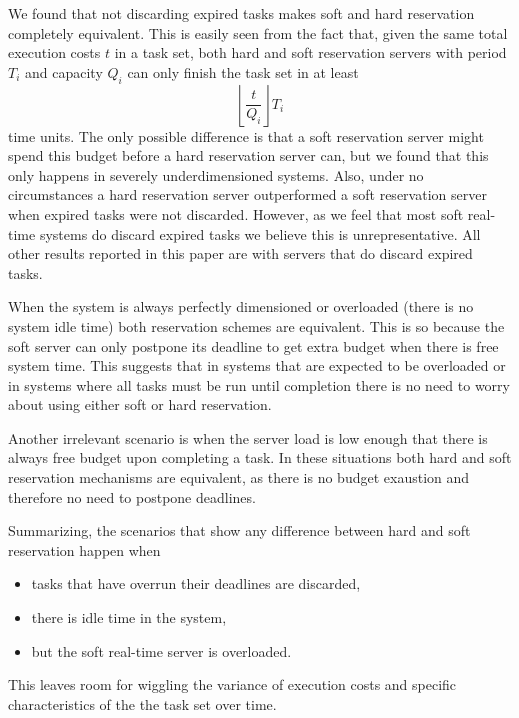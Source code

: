 \documentclass[times, 10pt,twocolumn]{article}
\begin{document}
\label{sec:disc-expir-tasks}

We found that not discarding expired tasks makes soft and hard
reservation completely equivalent. This is easily seen from the fact
that, given the same total execution costs $t$ in a task set, both
hard and soft reservation servers with period $T_i$ and capacity $Q_i$
can only finish the task set in at least
\[ \left\lfloor\frac{t}{Q_i}\right\rfloor T_i\]
time units. The only possible difference is that a soft reservation
server might spend this budget before a hard reservation server can,
but we found that this only happens in severely underdimensioned
systems. Also, under no circumstances a hard reservation server
outperformed a soft reservation server when expired tasks were not
discarded. However, as we feel that most soft real-time systems do
discard expired tasks we believe this is unrepresentative. All other
results reported in this paper are with servers that do discard
expired tasks.

\label{sec:system-load}

When the system is always perfectly dimensioned or overloaded (there
is no system idle time) both reservation schemes are equivalent. This
is so because the soft server can only postpone its deadline to get
extra budget when there is free system time. This suggests that in
systems that are expected to be overloaded or in systems where all
tasks must be run until completion there is no need to worry about
using either soft or hard reservation. 

\label{sec:server-load}

Another irrelevant scenario is when the server load is low enough that
there is always free budget upon completing a task. In these
situations both hard and soft reservation mechanisms are equivalent,
as there is no budget exaustion and therefore no need to postpone
deadlines.

Summarizing, the scenarios that show any difference between hard and
soft reservation happen when
\begin{itemize}
\item tasks that have overrun their deadlines are discarded,
\item there is idle time in the system,
\item but the soft real-time server is overloaded.
\end{itemize}
This leaves room for wiggling the variance of execution costs and
specific characteristics of the the task set over time.
\end{document}
